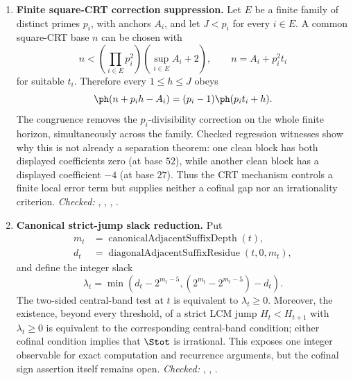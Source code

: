 {\begin{enumerate}[label=\textbf{R\arabic*.},ref=R\arabic*,leftmargin=2.4em,
  itemsep=0.2em,topsep=0.25em]
\item\label{res:squarecrt} 
\textbf{Finite square-CRT correction suppression.}  Let \(E\) be a finite
family of distinct primes \(p_i\), with anchors \(A_i\), and let \(J<p_i\) for
every \(i\in E\).  A common square-CRT base \(n\) can be chosen with
\[
 n<\left(\prod_{i\in E}p_i^2\right)(\sup_{i\in E}A_i+2),
 \qquad n=A_i+p_i^2t_i
\]
for suitable \(t_i\).  Therefore every \(1\le h\le J\) obeys
\[
 \ph(n+p_i h-A_i)=(p_i-1)\ph(p_i t_i+h).
\]
The congruence removes the \(p_i\)-divisibility correction on the whole
finite horizon, simultaneously across the family.  Checked regression
witnesses show why this is not already a separation theorem: one clean block
has both displayed coefficients zero (at base \(52\)), while another clean
block has a displayed coefficient \(-4\) (at base \(27\)).  Thus the CRT
mechanism controls a finite local error term but supplies neither a cofinal
gap nor an irrationality criterion.
{\footnotesize\emph{Checked:}
,
,
,
.}

\item\label{res:slackcriterion} 
\textbf{Canonical strict-jump slack reduction.}  Put
\[
 \begin{aligned}
 m_t&=\operatorname{canonicalAdjacentSuffixDepth}(t),\\
 d_t&=\operatorname{diagonalAdjacentSuffixResidue}(t,0,m_t),
 \end{aligned}
\]
and define the integer slack
\[
 \lambda_t=\min\!\left(d_t-2^{m_t-5},
       (2^{m_t}-2^{m_t-5})-d_t\right).
\]
The two-sided central-band test at $t$ is equivalent to
$\lambda_t\ge0$.  Moreover, the existence, beyond every threshold, of a
strict LCM jump $H_t<H_{t+1}$ with $\lambda_t\ge0$ is equivalent to the
corresponding central-band condition; either cofinal condition implies that
$\Stot$ is irrational.  This exposes one integer observable for exact
computation and recurrence arguments, but the cofinal sign assertion itself
remains open.
{\footnotesize\emph{Checked:}
,
,
.}


\end{enumerate}}
